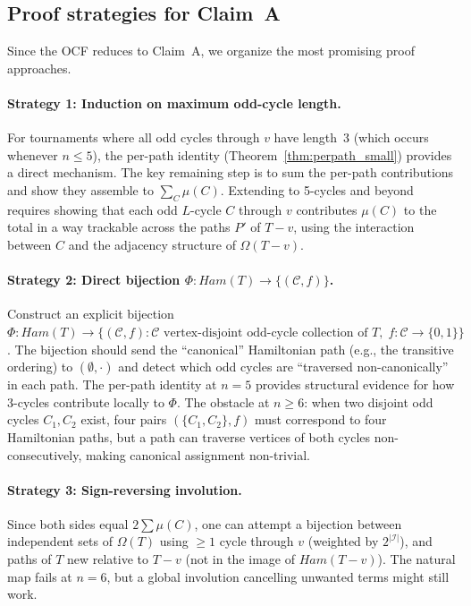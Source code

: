 \documentclass[12pt,reqno]{amsart}
\theoremstyle{plain}
\theoremstyle{definition}
\theoremstyle{remark}
\newcommand{\Ham}{\mathrm{Ham}}
\renewcommand{\Ham}{Ham}%
\begin{document}
\subsection{Proof strategies for Claim~A}
\label{subsec:claim_strategies}

Since the OCF reduces to Claim~A, we organize the most promising proof approaches.

\paragraph{Strategy 1: Induction on maximum odd-cycle length.}
For tournaments where all odd cycles through $v$ have length~3 (which occurs
whenever $n \leq 5$), the per-path identity (Theorem~\ref{thm:perpath_small})
provides a direct mechanism. The key remaining step is to sum the per-path
contributions and show they assemble to $\sum_C \mu(C)$. Extending to
5-cycles and beyond requires showing that each odd $L$-cycle $C$ through $v$
contributes $\mu(C)$ to the total in a way trackable across the paths $P'$
of $T{-}v$, using the interaction between $C$ and the adjacency structure
of $\Omega(T{-}v)$.

\paragraph{Strategy 2: Direct bijection $\Phi: \Ham(T) \to \{(\mathcal{C}, f)\}$.}
Construct an explicit bijection
$\Phi: \Ham(T) \to \{(\mathcal{C}, f) : \mathcal{C}\text{ vertex-disjoint odd-cycle
collection of }T,\; f: \mathcal{C} \to \{0,1\}\}$.
The bijection should send the ``canonical'' Hamiltonian path (e.g., the transitive
ordering) to $(\emptyset, \cdot)$ and detect which odd cycles are ``traversed
non-canonically'' in each path. The per-path identity at $n=5$ provides
structural evidence for how 3-cycles contribute locally to $\Phi$.
The obstacle at $n \geq 6$: when two disjoint odd cycles $C_1, C_2$ exist,
four pairs $(\{C_1,C_2\}, f)$ must correspond to four Hamiltonian paths, but
a path can traverse vertices of both cycles non-consecutively, making canonical
assignment non-trivial.

\paragraph{Strategy 3: Sign-reversing involution.}
Since both sides equal $2\sum\mu(C)$, one can attempt a bijection between
independent sets of $\Omega(T)$ using $\geq 1$ cycle through $v$
(weighted by $2^{|\mathcal{I}|}$), and paths of $T$ new relative to $T{-}v$
(not in the image of $\Ham(T{-}v)$). The natural map fails at $n=6$, but
a global involution cancelling unwanted terms might still work.
\end{document}

